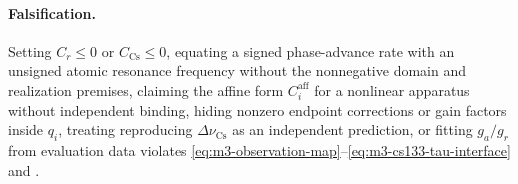 \paragraph{Falsification.}
Setting \(C_r\le 0\) or \(C_{\mathrm{Cs}}\le 0\), equating a signed phase-advance
rate with an unsigned atomic resonance frequency without the nonnegative
domain and realization premises, claiming the affine form \(C_i^{\mathrm{aff}}\)
for a nonlinear apparatus without independent binding, hiding nonzero endpoint
corrections or gain factors inside \(q_i\), treating reproducing
\(\Delta\nu_{\mathrm{Cs}}\) as an independent prediction, or fitting \(g_a/g_r\)
from evaluation data violates \eqref{eq:m3-observation-map}--\eqref{eq:m3-cs133-tau-interface}
and .
